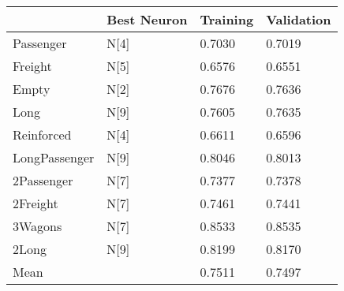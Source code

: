 \begin{tabular}{llll}
\toprule
 & Best Neuron & Training & Validation \\
\midrule
Passenger & N[4] & 0.7030 & 0.7019 \\
Freight & N[5] & 0.6576 & 0.6551 \\
Empty & N[2] & 0.7676 & 0.7636 \\
Long & N[9] & 0.7605 & 0.7635 \\
Reinforced & N[4] & 0.6611 & 0.6596 \\
LongPassenger & N[9] & 0.8046 & 0.8013 \\
2Passenger & N[7] & 0.7377 & 0.7378 \\
2Freight & N[7] & 0.7461 & 0.7441 \\
3Wagons & N[7] & 0.8533 & 0.8535 \\
2Long & N[9] & 0.8199 & 0.8170 \\
Mean &  & 0.7511 & 0.7497 \\
\bottomrule
\end{tabular}
